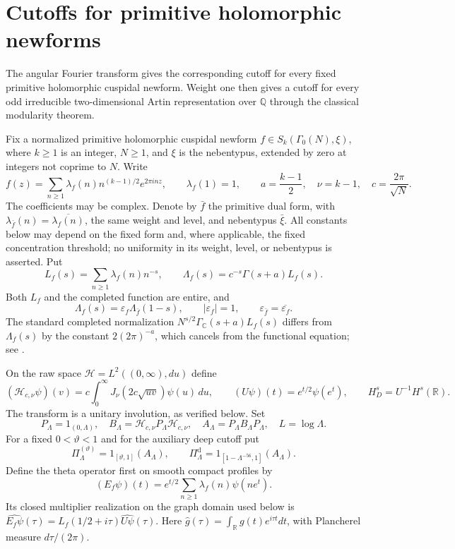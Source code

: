 \section{Cutoffs for primitive holomorphic newforms}
\label{hnew:section}

The angular Fourier transform gives the corresponding cutoff for every
fixed primitive holomorphic cuspidal newform.  Weight one then gives
a cutoff for every odd irreducible two-dimensional Artin representation
over $\mathbb Q$ through the classical modularity theorem.

Fix a normalized primitive holomorphic cuspidal newform
$f\in S_k(\Gamma_0(N),\xi)$, where $k\ge1$ is an integer,
$N\ge1$, and $\xi$ is the nebentypus, extended by zero at integers
not coprime to $N$.  Write
\[
 f(z)=\sum_{n\ge1}\lambda_f(n)n^{(k-1)/2}e^{2\pi inz},
 \qquad \lambda_f(1)=1,\qquad
 a=\frac{k-1}{2},\quad \nu=k-1,\quad c=\frac{2\pi}{\sqrt N}.
\]
The coefficients may be complex.  Denote by $\bar f$ the primitive
dual form, with $\lambda_{\bar f}(n)=\overline{\lambda_f(n)}$,
the same weight and level, and nebentypus $\bar\xi$.
All constants below may depend on the fixed form and, where applicable,
the fixed concentration threshold; no uniformity
in its weight, level, or nebentypus is asserted.  Put
\begin{equation}\label{hnew:completed}
 L_f(s)=\sum_{n\ge1}\lambda_f(n)n^{-s},\qquad
 \Lambda_f(s)=c^{-s}\Gamma(s+a)L_f(s).
\end{equation}
Both $L_f$ and the completed function are entire, and
\[
 \Lambda_f(s)=\varepsilon_f\Lambda_{\bar f}(1-s),\qquad
 |\varepsilon_f|=1,\qquad
 \varepsilon_{\bar f}=\overline{\varepsilon_f}.
\]
The standard completed normalization
$N^{s/2}\Gamma_{\mathbb C}(s+a)L_f(s)$ differs from
$\Lambda_f(s)$ by the constant $2(2\pi)^{-a}$, which cancels
from the functional equation; see
\citet[pp.~1--3 of the author preprint]{booker2019}.

On the raw space $\mathcal H=L^2((0,\infty),du)$ define
\[
 (\mathcal H_{c,\nu}\psi)(v)
   =c\int_0^\infty J_\nu(2c\sqrt{uv})\psi(u)\,du,\qquad
 (U\psi)(t)=e^{t/2}\psi(e^t),\qquad H_D^s=U^{-1}H^s(\mathbb R).
\]
The transform is a unitary involution, as verified below.
Set
\[
 P_\Lambda=1_{(0,\Lambda)},\quad
 B_\Lambda=\mathcal H_{c,\nu}P_\Lambda\mathcal H_{c,\nu},\quad
 A_\Lambda=P_\Lambda B_\Lambda P_\Lambda,\quad L=\log\Lambda.
\]
For a fixed $0<\vartheta<1$ and for the auxiliary deep cutoff put
\begin{equation}\label{hnew:selections}
 \Pi_\Lambda^{(\vartheta)}=1_{[\vartheta,1]}(A_\Lambda),
 \qquad
 \Pi_\Lambda^{\mathrm d}=1_{[1-\Lambda^{-56},1]}(A_\Lambda).
\end{equation}
Define the theta operator first on smooth compact profiles by
\begin{equation}\label{hnew:theta}
 (E_f\psi)(t)=e^{t/2}\sum_{n\ge1}\lambda_f(n)\psi(ne^t).
\end{equation}
Its closed multiplier realization on the graph domain used below is
$\widehat{E_f\psi}(\tau)=L_f(1/2+i\tau)\widehat{U\psi}(\tau)$.
Here $\widehat g(\tau)=\int_{\mathbb R}g(t)e^{i\tau t}dt$,
with Plancherel measure $d\tau/(2\pi)$.

